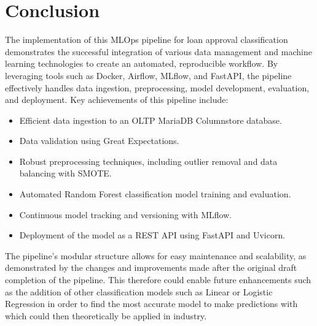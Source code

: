 \documentclass[12pt]{report}
\begin{document}
\chapter*{Conclusion}

The implementation of this MLOps pipeline for loan approval classification demonstrates the successful integration of various
data management and machine learning technologies to create an automated, reproducible workflow. By leveraging tools such as Docker,
Airflow, MLflow, and FastAPI, the pipeline effectively handles data ingestion, preprocessing, model development, evaluation, and 
deployment. Key achievements of this pipeline include:

\begin{itemize}
    \item Efficient data ingestion to an OLTP MariaDB Columnstore database.
    \item Data validation using Great Expectations.
    \item Robust preprocessing techniques, including outlier removal and data balancing with SMOTE.
    \item Automated Random Forest classification model training and evaluation.
    \item Continuous model tracking and versioning with MLflow.
    \item Deployment of the model as a REST API using FastAPI and Uvicorn.
\end{itemize}

\noindent The pipeline's modular structure allows for easy maintenance and scalability, as demonstrated by the changes and improvements 
made after the original draft completion of the pipeline. This therefore could enable future enhancements such as the addition 
of other classification models such as Linear or Logistic Regression in order to find the most accurate model to make predictions with 
which could then theoretically be applied in industry.
   



% 







\printbibliography
\end{document}
